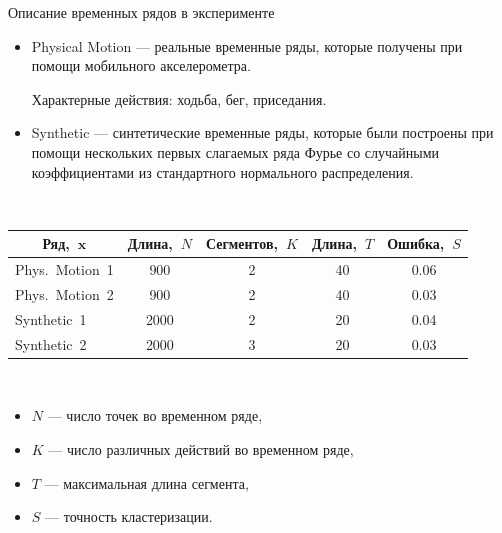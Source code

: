 \documentclass[10pt,pdf,hyperref={unicode}]{beamer}
\begin{document}
\begin{frame}[shrink=5]{Описание временных рядов в эксперименте}

\begin{itemize}
	\item Physical Motion --- реальные временные ряды, которые получены при помощи мобильного акселерометра.  
	
	Характерные действия: ходьба, бег, приседания.
	\item Synthetic --- синтетические временные ряды, которые были построены при помощи нескольких первых слагаемых ряда Фурье со случайными коэффициентами из стандартного нормального распределения. 
\end{itemize}

~\\
\begin{tabular}{|c|c|c|c|c|}
\hline
	Ряд,~$\textbf{x}$ &Длина,~$N$& Сегментов,~$K$&Длина,~$T$& Ошибка,~$S$\\
	\hline
	\multicolumn{1}{|l|}{Phys.~Motion~1}
	& 900& 2& 40& 0.06\\
	\hline
	\multicolumn{1}{|l|}{Phys.~Motion~2}
	& 900& 2& 40& 0.03\\
	\hline
	\multicolumn{1}{|l|}{Synthetic~1}
	& 2000& 2& 20& 0.04\\
	\hline
	\multicolumn{1}{|l|}{Synthetic~2}
	& 2000& 3& 20& 0.03\\
\hline
\end{tabular}

~\\
\begin{itemize}
	\item $N$ --- число точек во временном ряде,
	\item $K$ --- число различных действий во временном ряде,
	\item $T$ --- максимальная длина сегмента,
	\item $S$ --- точность кластеризации.
\end{itemize}

\end{frame}
\end{document}
